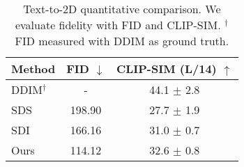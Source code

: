 \begin{table}[t]
    \centering  
    \caption{
       Text-to-2D quantitative comparison. We evaluate fidelity with FID and CLIP-SIM. $^\dagger$FID measured with DDIM as ground truth.
    }
    \label{tab:image_fusion}
    \setlength{\tabcolsep}{2mm}
    \begin{tabular}{@{}lcc@{}}
        \toprule
        \textbf{Method} & \textbf{FID} $\downarrow$ & \multicolumn{1}{c}{\textbf{CLIP-SIM (L/14) $\uparrow$ }}\\
        \midrule
        DDIM$^\dagger$ & - & 44.1 $\pm$ 2.8\\
        SDS & 198.90 & 27.7 $\pm$ 1.9\\ 
        SDI & 166.16 & 31.0 $\pm$ 0.7 \\ 
        Ours & 114.12 & 32.6 $\pm$ 0.8\\ 
        \midrule
    \end{tabular}%
\end{table}
